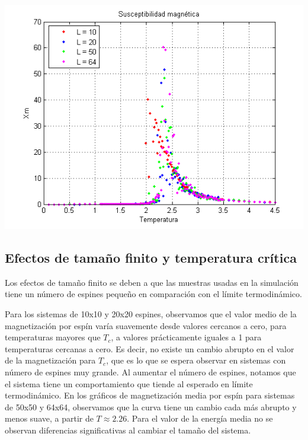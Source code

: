 \documentclass[twocolumn,Spanish,a4paper,11pt]{article}
\begin{document}
\begin{minipage}{0.45\textwidth}									
\centering
\includegraphics[totalheight=0.25\textheight]{figuras/susceptibilidad_magnetica.png}
\label{grafico_susceptibilidad_magnetica}
\end{minipage}

\subsection{Efectos de tamaño finito y temperatura
crítica}

Los efectos de tamaño finito se deben a que las
muestras usadas en la simulación tiene un número
de espines pequeño en comparación con el límite
termodinámico.

Para los sistemas de 10x10 y 20x20 espines,
observamos que el valor medio de la magnetización
por espín varía suavemente desde valores cercanos a
cero, para temperaturas mayores que $T_c$, a valores
prácticamente iguales a 1 para temperaturas cercanas
a cero. Es decir, no existe un cambio abrupto en el
valor de la magnetización para $T_c$, que es lo que se
espera observar en sistemas con número de espines muy
grande. Al aumentar el número de espines, notamos
que el sistema tiene un comportamiento que tiende
al esperado en límite termodinámico. En los gráficos
de magnetización media por espín para sistemas de
50x50 y 64x64, observamos que la curva tiene un
cambio cada más abrupto y menos suave, a partir de
$T\approx 2.26$. Para el valor de la
energía media no se observan diferencias significativas
al cambiar el tamaño del sistema.
\end{document}

